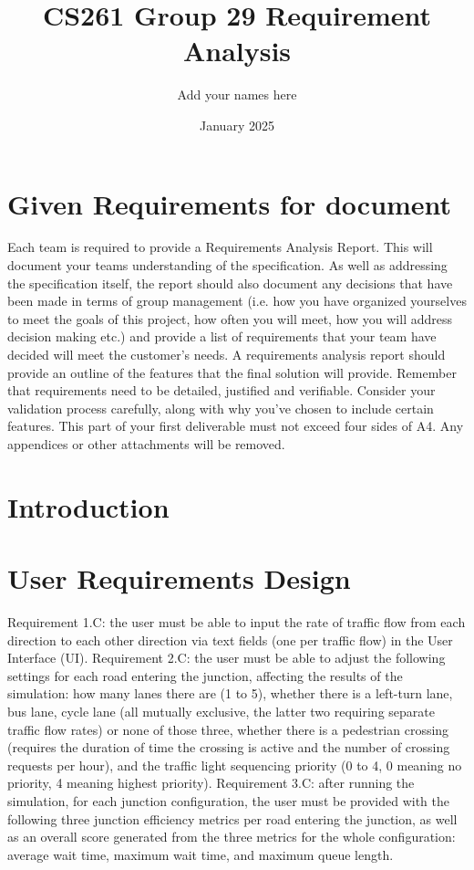 \documentclass{article}
\title{CS261 Group 29 Requirement Analysis}
\author{Add your names here}
\date{January 2025}
\begin{document}
\maketitle

\section{Given Requirements for document}
Each team is required to provide a Requirements Analysis Report. This will document your teams understanding of the specification. As well as addressing the specification itself, the report should also document any decisions that have been made in terms of group management (i.e. how you have organized yourselves to meet the goals of this project, how often you will meet, how you will address decision making etc.) and provide a list of requirements that your team have decided will meet the customer's needs.
A requirements analysis report should provide an outline of the features that the final solution will provide. Remember that requirements need to be detailed, justified and verifiable. Consider your validation process carefully, along with why you've chosen to include certain features.
This part of your first deliverable must not exceed four sides of A4. Any appendices or other attachments will be removed.

\section{Introduction}

\section{User Requirements Design}
Requirement 1.C: the user must be able to input the rate of traffic flow from each direction to each other direction via text fields (one per traffic flow) in the User Interface (UI).
Requirement 2.C: the user must be able to adjust the following settings for each road entering the junction, affecting the results of the simulation: how many lanes there are (1 to 5), whether there is a left-turn lane, bus lane, cycle lane (all mutually exclusive, the latter two requiring separate traffic flow rates) or none of those three, whether there is a pedestrian crossing (requires the duration of time the crossing is active and the number of crossing requests per hour), and the traffic light sequencing priority (0 to 4, 0 meaning no priority, 4 meaning highest priority).
Requirement 3.C: after running the simulation, for each junction configuration, the user must be provided with the following three junction efficiency metrics per road entering the junction, as well as an overall score generated from the three metrics for the whole configuration: average wait time, maximum wait time, and maximum queue length.
\end{document}
